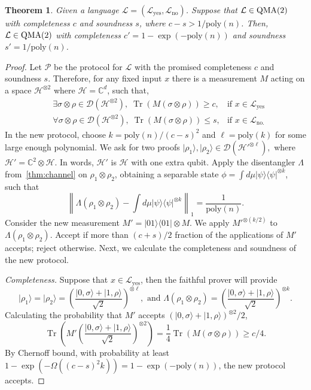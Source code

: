 \documentclass[10pt,a4paper]{article}
\newtheorem{theorem}{Theorem}[section]
\theoremstyle{remark}
\def\cal{\mathcal}
\newcommand{\C}{{\mathbb C}}
\newcommand{\calD}{{\cal D}}
\newcommand{\calH}{{\cal H}}
\newcommand{\calL}{{\cal L}}
\newcommand{\calP}{{\cal P}}
\newcommand{\poly}{{\mathrm{poly}}}
\newcommand{\1}[1]{\mathds{1}{[#1]}}
\newcommand{\ket}[1]{\lvert #1\rangle}
\newcommand{\QMA}{\textup{QMA}}
\newcommand{\trace}{\operatorname{Tr}}
\newcommand{\bra}[1]{\langle#1|}
\numberwithin{equation}{section}
\begin{document}
\begin{theorem}
Given a language $\calL=(\calL_{\mathrm{yes}}, \calL_{\mathrm{no}})$. Suppose that $\calL \in \QMA(2)$ with completeness $c$ and soundness $s$, where $c-s>1/\poly(n)$. Then, $\calL\in\QMA(2)$ with completeness $c'=1-\exp(-\poly(n))$ and soundness $s'=1/\poly(n)$.
\end{theorem}

\begin{proof}
Let $\calP$ be the protocol for $\calL$ with the promised completeness $c$
and soundness $s$. Therefore, for any fixed input $x$ there is a measurement $M$ acting on a space $\calH^{\otimes 2}$ where $\calH=\C^{d}$, such that,
\begin{align}
        &\exists \sigma\otimes \rho \in \calD(\calH^{\otimes 2}), \; 
            \trace(M (\sigma\otimes\rho) ) \ge c,
                &\text{if } x\in \calL_{\mathrm{yes}}
        \nonumber \\
        &\forall \sigma\otimes\rho \in \calD(\calH^{\otimes 2}), \; 
            \trace(M (\sigma\otimes\rho) ) \le s,
                &\text{if } x\in \calL_{\mathrm{no}.}
        \nonumber
\end{align}
In the new protocol, choose $k=\poly(n)/(c-s)^2$ and $\ell=\poly(k)$ for some large enough polynomial. We ask for two proofs $\ket{\rho_1}, \ket{\rho_2} \in \calD(\calH'^{\otimes\ell}),$ where $\calH'=\C^2 \otimes \calH$. In words, $\calH'$ is $\calH$ with one extra qubit. Apply the disentangler $\Lambda$ from~\cref{thm:channel} on $\rho_1\otimes\rho_2$, obtaining a separable state $\phi=\int d\mu \ket\psi\bra\psi ^{\otimes k}$, such that
\begin{equation}
    \left\|\Lambda(\rho_1\otimes\rho_2)-\int d\mu \ket\psi\bra\psi ^{\otimes k}\right\|_1 = \frac{1}{\poly(n)}.\label{eq:gap-amp-error}
\end{equation}
Consider the new measurement $M'=|01\rangle\langle01|\otimes M$. We apply $M'^{\otimes (k/2)}$ to $\Lambda(\rho_1\otimes\rho_2)$. Accept if more than $(c+s)/2$ fraction of the applications of $M'$ accepts; reject otherwise. Next, we calculate the completeness and soundness of the new protocol.

\emph{Completeness.} Suppose that $x\in\calL_{\mathrm{yes}}$, then the faithful prover will provide
\[
    \ket{\rho_1}=\ket{\rho_2}=\left(\frac{|0,\sigma\rangle+|1,\rho\rangle}{\sqrt{2}}\right)^{\otimes \ell}, \text{ and } \Lambda(\rho_1\otimes\rho_2)=\left(\frac{|0,\sigma\rangle+|1,\rho\rangle}{\sqrt{2}}\right)^{\otimes k}.
\]
Calculating the probability that $M'$ accepts $(|0,\sigma\rangle+|1,\rho\rangle)^{\otimes 2}/2$,
\[
    \trace\left( M' \left(\frac{|0,\sigma\rangle+|1,\rho\rangle}{\sqrt2}\right)^{\otimes 2}
    \right) = \frac{1}{4}\trace( M (\sigma\otimes \rho))\ge c/4.
\]
By Chernoff bound, with probability at least $1-\exp(-\Omega((c-s)^2 k))=1-\exp(-\poly(n))$, the new protocol accepts.


\end{proof}
\end{document}
